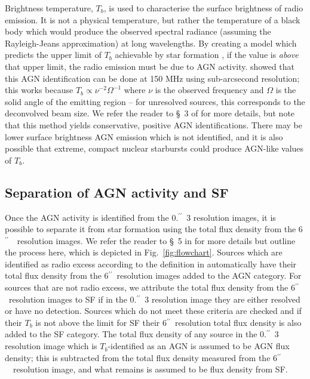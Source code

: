\documentclass[usenatbib,fleqn,letters]{mnras}
\newcommand{\sarc}{$^{\prime\prime}\!\!$}
\begin{document}
Brightness temperature, $T_b$, is used to characterise the surface brightness of radio emission. It is not a physical temperature, but rather the temperature of a black body  which would produce the observed spectral radiance (assuming the Rayleigh-Jeans approximation) at long wavelengths. By creating a model which predicts the upper limit of $T_b$ achievable by star formation \citep[based on][]{condon_radio_1992}, if the value is \textit{above} that upper limit, the radio emission must be due to AGN activity.   showed that this AGN identification can be done at 150 MHz using sub-arcsecond resolution; this works because $T_b\propto\nu^{-2}\Omega^{-1}$ where $\nu$ is the observed frequency and $\Omega$ is the solid angle of the emitting region -- for unresolved sources, this corresponds to the deconvolved beam size. We refer the reader to \S~3 of  for more details, but note that this method yields conservative, positive AGN identifications. There may be lower surface brightness AGN emission which is not identified, and it is also possible \citep[although unlikely, according to][]{condon_radio_1992} that extreme, compact nuclear starbursts could produce AGN-like values of $T_b$. 

\subsection{Separation of AGN activity and SF}
Once the AGN activity is identified from the 0.\sarc\ 3 resolution images, it is possible to separate it from star formation using the total flux density from the 6\sarc\ \ resolution images. We refer the reader to \S~5 in  for more details but outline the process here, which is depicted in Fig.~\ref{fig:flowchart}. Sources which are identified as radio excess according to the definition in  automatically have their total flux density from the 6\sarc\ resolution images added to the AGN category. For sources that are not radio excess, we attribute the total flux density from the 6\sarc\ resolution images to SF if in the 0.\sarc\ 3 resolution image they are either resolved or have no detection. Sources which do not meet these criteria are checked and if their $T_b$ is not above the limit for SF their 6\sarc\ resolution total flux density is also added to the SF category. The total flux density of any source in the 0.\sarc\ 3 resolution image which is $T_b$-identified as an AGN is assumed to be AGN flux density; this is subtracted from the total flux density measured from the 6\sarc\ \ resolution image, and what remains is assumed to be flux density from SF. 
\end{document}
